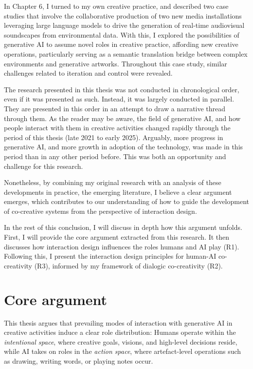 In Chapter 6, I turned to my own creative practice, and described two case studies that involve the collaborative production of two new media installations leveraging large language models to drive the generation of real-time audiovisual soundscapes from environmental data. With this, I explored the possibilities of generative AI to assume novel roles in creative practice, affording new creative operations, particularly serving as a semantic translation bridge between complex environments and generative artworks. Throughout this case study, similar challenges related to iteration and control were revealed.

The research presented in this thesis was not conducted in chronological order, even if it was presented as such. Instead, it was largely conducted in parallel. They are presented in this order in an attempt to draw a narrative thread through them. As the reader may be aware, the field of generative AI, and how people interact with them in creative activities changed rapidly through the period of this thesis (late 2021 to early 2025). Arguably, more progress in generative AI, and more growth in adoption of the technology, was made in this period than in any other period before. This was both an opportunity and challenge for this research.

Nonetheless, by combining my original research with an analysis of these developments in practice, the emerging literature, I believe a clear argument emerges, which contributes to our understanding of how to guide the development of co-creative systems from the perspective of interaction design.

In the rest of this conclusion, I will discuss in depth how this argument unfolds. First, I will provide the core argument extracted from this research. It then discusses how interaction design influences the roles humans and AI play (R1). Following this, I present the interaction design principles for human-AI co-creativity (R3), informed by my framework of dialogic co-creativity (R2).


\section{Core argument}

This thesis argues that prevailing modes of interaction with generative AI in creative activities induce a clear role distribution: Humans operate within the \textit{intentional space}, where creative goals, visions, and high-level decisions reside, while AI takes on roles in the \textit{action space}, where artefact-level operations such as drawing, writing words, or playing notes occur.


